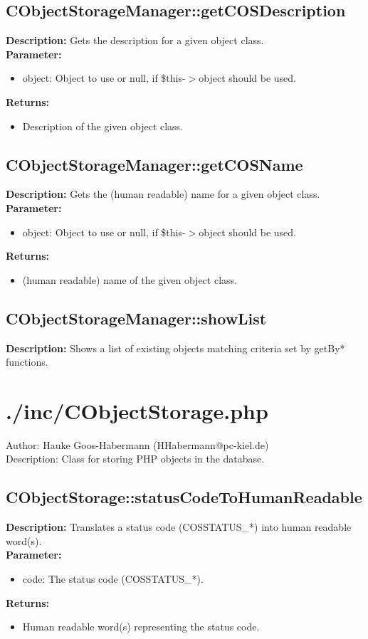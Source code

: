 \subsection{CObjectStorageManager::getCOSDescription}
\textbf{Description:} Gets the description for a given object class.\\
\textbf{Parameter:}
\begin{itemize}
\item object: Object to use or null, if \$this-$>$object should be used.
\end{itemize}
\textbf{Returns:}
\begin{itemize}
\item Description of the given object class.
\end{itemize}

\subsection{CObjectStorageManager::getCOSName}
\textbf{Description:} Gets the (human readable) name for a given object class.\\
\textbf{Parameter:}
\begin{itemize}
\item object: Object to use or null, if \$this-$>$object should be used.
\end{itemize}
\textbf{Returns:}
\begin{itemize}
\item (human readable) name of the given object class.
\end{itemize}

\subsection{CObjectStorageManager::showList}
\textbf{Description:} Shows a list of existing objects matching criteria set by getBy* functions.\\

\newpage\section{./inc/CObjectStorage.php}
 Author: Hauke Goos-Habermann (HHabermann@pc-kiel.de)\\
 Description: Class for storing PHP objects in the database.\\

\subsection{CObjectStorage::statusCodeToHumanReadable}
\textbf{Description:} Translates a status code (COSSTATUS\_*) into human readable word(s).\\
\textbf{Parameter:}
\begin{itemize}
\item code: The status code (COSSTATUS\_*).
\end{itemize}
\textbf{Returns:}
\begin{itemize}
\item Human readable word(s) representing the status code.
\end{itemize}

